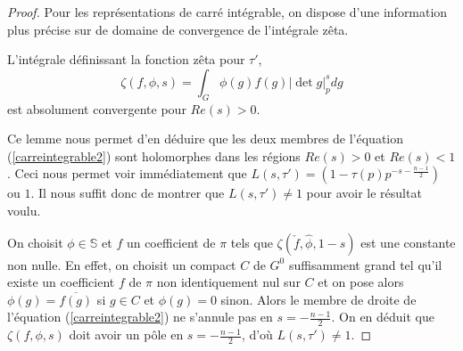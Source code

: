 \begin{proof}
Pour les représentations de carré intégrable, on dispose d'une information plus précise sur de domaine de convergence de l'intégrale zêta.
\begin{lemme}
L'intégrale définissant la fonction zêta pour $\tau'$,
\begin{equation}
\zeta(f, \phi, s) = \int_{G} \phi(g)f(g)|\det g|_p^s dg
\end{equation}
est absolument convergente pour $Re(s) > 0$.
\end{lemme}

Ce lemme nous permet d'en déduire que les deux membres de l'équation (\ref{carreintegrable2}) sont holomorphes dans les régions $Re(s) > 0$ et $Re(s) < 1$. Ceci nous permet voir immédiatement que $L(s, \tau') = (1-\tau(p)p^{-s-\frac{n-1}{2}})$ ou $1$. Il nous suffit donc de montrer que $L(s, \tau') \neq 1$ pour avoir le résultat voulu.

On choisit $\phi \in \mathbb{S}$ et $f$ un coefficient de $\pi$ tels que $\zeta(\check{f}, \hat{\phi}, 1-s)$ est une constante non nulle. En effet, on choisit un compact $C$ de $G^0$ suffisamment grand tel qu'il existe un coefficient $f$ de $\pi$ non identiquement nul sur $C$ et on pose alors $\phi(g) = \overline{f(g)}$ si $g \in C$ et $\phi(g)=0$ sinon. Alors le membre de droite de l'équation (\ref{carreintegrable2}) ne s'annule pas en $s=-\frac{n-1}{2}$. On en déduit que $\zeta(f, \phi, s)$ doit avoir un pôle en $s=-\frac{n-1}{2}$, d'où $L(s,\tau')\neq 1$.
\end{proof}